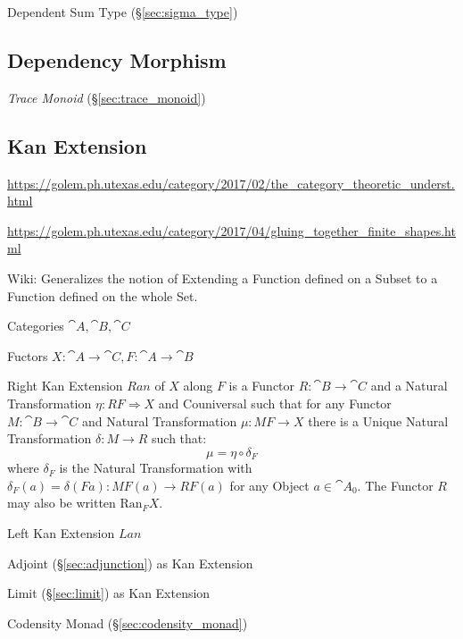 Dependent Sum Type (\S\ref{sec:sigma_type})



\subsection{Dependency Morphism}\label{sec:dependency_morphism}

\emph{Trace Monoid} (\S\ref{sec:trace_monoid})



\subsection{Kan Extension}\label{sec:kan_extension}

\url{https://golem.ph.utexas.edu/category/2017/02/the_category_theoretic_underst.html}

\url{https://golem.ph.utexas.edu/category/2017/04/gluing_together_finite_shapes.html}

Wiki: Generalizes the notion of Extending a Function defined on a
Subset to a Function defined on the whole Set.

Categories $\cat{A}, \cat{B}, \cat{C}$

Fuctors $X : \cat{A} \rightarrow \cat{C}, F : \cat{A} \rightarrow
\cat{B}$

Right Kan Extension $Ran$ of $X$ along $F$ is a Functor $R : \cat{B}
\rightarrow \cat{C}$ and a Natural Transformation $\eta : RF
\Rightarrow X$ and Couniversal such that for any Functor $M : \cat{B}
\rightarrow \cat{C}$ and Natural Transformation $\mu : MF \rightarrow
X$ there is a Unique Natural Transformation $\delta : M \rightarrow R$
such that:
\[
  \mu = \eta \circ \delta_F
\]
where $\delta_F$ is the Natural Transformation with $\delta_F(a) =
\delta (F a) : M F(a) \rightarrow RF(a)$ for any Object $a \in
\cat{A}_0$. The Functor $R$ may also be written $\mathrm{Ran}_F X$.

Left Kan Extension $Lan$

Adjoint (\S\ref{sec:adjunction}) as Kan Extension

Limit (\S\ref{sec:limit}) as Kan Extension

Codensity Monad (\S\ref{sec:codensity_monad})

